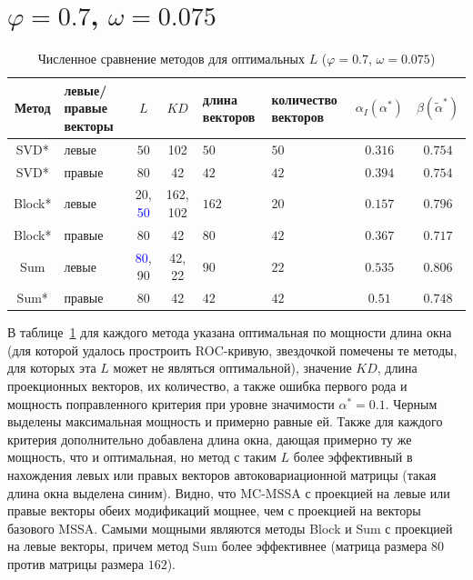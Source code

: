 \documentclass[specialist,
substylefile = spbu_report.rtx,
subf,href,colorlinks=true, 12pt]{disser}
\theoremstyle{definition}
\begin{document}
\section{$\varphi=0.7$, $\omega=0.075$}
\begin{table}[h]
	\caption{Численное сравнение методов для оптимальных $L$ ($\varphi=0.7$, $\omega=0.075$)}
	\label{tab:res_mc-ssa}
	\centering
	\begin{tabular}{|c>{\centering\arraybackslash}m{1in}cc>{\centering\arraybackslash}m{1in} >{\centering\arraybackslash}m{1in}cc|}\hline
		Метод & левые/правые векторы & $L$ & $KD$ & длина векторов & количество векторов & $\alpha_I(\alpha^*)$ & $\beta(\widetilde\alpha^*)$ \\
		\hline
		SVD* & левые & $50$ &102& $50$ & $50$ & $0.316$ & $0.754$\\
		\hline
		SVD* & правые & $80$ &42& $42$ & $42$ & $0.394$ & $0.754$\\
		\hline
		Block* & левые & 20, \textcolor{blue}{50} & 162, 102 & $162$ & $20$ & $0.157$ & $\mathbf{0.796}$ \\
		\hline
		Block* & правые & $80$ &42& $80$ & $42$ & $0.367$ & $0.717$\\
		\hline
		Sum & левые & \textcolor{blue}{80}, 90 &42, 22& $90$ & $22$ & $0.535$ & $\mathbf{0.806}$ \\
		\hline
		Sum* & правые & $80$ &42& $42$ & $42$ & $0.51$ & $0.748$ \\
		\hline
	\end{tabular}
\end{table}
В таблице~\ref{tab:res_mc-ssa} для каждого метода указана оптимальная по мощности длина окна (для которой удалось простроить ROC-кривую, звездочкой помечены те методы, для которых эта $L$ может не являться оптимальной), значение $KD$, длина проекционных векторов, их количество, а также ошибка первого рода и мощность поправленного критерия при уровне значимости $\alpha^*=0.1$. Черным выделены максимальная мощность и примерно равные ей. Также для каждого критерия дополнительно добавлена длина окна, дающая примерно ту же мощность, что и оптимальная, но метод с таким $L$ более эффективный в нахождения левых или правых векторов автоковариационной матрицы (такая длина окна выделена синим). Видно, что MC-MSSA с проекцией на левые или правые векторы обеих модификаций мощнее, чем с проекцией на векторы базового MSSA. Самыми мощными являются методы Block и Sum с проекцией на левые векторы, причем метод Sum более эффективнее (матрица размера $80$ против матрицы размера $162$).
\end{document}
